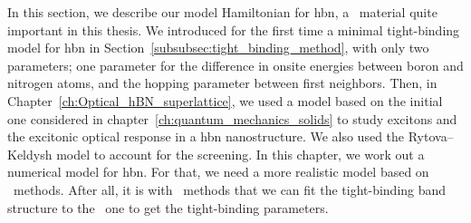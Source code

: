 In this section, we describe our model Hamiltonian for \gls{hbn}, a \bd~material quite important in this thesis.
We introduced for the first time a minimal tight-binding model for \gls{hbn} in Section~\ref{subsubsec:tight_binding_method}, with only two parameters; one parameter for the difference in onsite energies between boron and nitrogen atoms, and the hopping parameter between first neighbors.
Then, in Chapter~\ref{ch:Optical_hBN_superlattice}, we used a model based on the initial one considered in chapter~\ref{ch:quantum_mechanics_solids} to study excitons and the excitonic optical response in a \gls{hbn} nanostructure.
We also used the Rytova--Keldysh model to account for the screening.
In this chapter, we work out a numerical model for \gls{hbn}.
For that, we need a more realistic model based on \abinit~methods.
After all, it is with \abinit~methods that we can fit the tight-binding band structure to the \abinit~one to get the tight-binding parameters.

